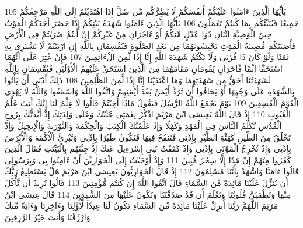 {\tiny\colorbox{cl_aya}{105}} يَأَيُّهَا الَّذِينَ ءَامَنُوا عَلَيْكُمْ أَنفُسَكُمْ لَا يَضُرُّكُم مَّن ضَلَّ إِذَا اهْتَدَيْتُمْ إِلَى اللَّهِ مَرْجِعُكُمْ جَمِيعًا فَيُنَبِّئُكُم بِمَا كُنتُمْ تَعْمَلُونَ
{\tiny\colorbox{cl_aya}{106}} يَأَيُّهَا الَّذِينَ ءَامَنُوا شَهَدَةُ بَيْنِكُمْ إِذَا حَضَرَ أَحَدَكُمُ الْمَوْتُ حِينَ الْوَصِيَّةِ اثْنَانِ ذَوَا عَدْلٍ مِّنكُمْ أَوْ ءَاخَرَانِ مِنْ غَيْرِكُمْ إِنْ أَنتُمْ ضَرَبْتُمْ فِى الْأَرْضِ فَأَصَبَتْكُم مُّصِيبَةُ الْمَوْتِ تَحْبِسُونَهُمَا مِن بَعْدِ الصَّلَوةِ فَيُقْسِمَانِ بِاللَّهِ إِنِ ارْتَبْتُمْ لَا نَشْتَرِى بِهِ ثَمَنًا وَلَوْ كَانَ ذَا قُرْبَى وَلَا نَكْتُمُ شَهَدَةَ اللَّهِ إِنَّا إِذًا لَّمِنَ الْءَاثِمِينَ
{\tiny\colorbox{cl_aya}{107}} فَإِنْ عُثِرَ عَلَى أَنَّهُمَا اسْتَحَقَّا إِثْمًا فََٔاخَرَانِ يَقُومَانِ مَقَامَهُمَا مِنَ الَّذِينَ اسْتَحَقَّ عَلَيْهِمُ الْأَوْلَيَنِ فَيُقْسِمَانِ بِاللَّهِ لَشَهَدَتُنَا أَحَقُّ مِن شَهَدَتِهِمَا وَمَا اعْتَدَيْنَا إِنَّا إِذًا لَّمِنَ الظَّلِمِينَ
{\tiny\colorbox{cl_aya}{108}} ذَلِكَ أَدْنَى أَن يَأْتُوا بِالشَّهَدَةِ عَلَى وَجْهِهَا أَوْ يَخَافُوا أَن تُرَدَّ أَيْمَنٌ بَعْدَ أَيْمَنِهِمْ وَاتَّقُوا اللَّهَ وَاسْمَعُوا وَاللَّهُ لَا يَهْدِى الْقَوْمَ الْفَسِقِينَ
{\tiny\colorbox{cl_aya}{109}} يَوْمَ يَجْمَعُ اللَّهُ الرُّسُلَ فَيَقُولُ مَاذَا أُجِبْتُمْ قَالُوا لَا عِلْمَ لَنَا إِنَّكَ أَنتَ عَلَّمُ الْغُيُوبِ
{\tiny\colorbox{cl_aya}{110}} إِذْ قَالَ اللَّهُ يَعِيسَى ابْنَ مَرْيَمَ اذْكُرْ نِعْمَتِى عَلَيْكَ وَعَلَى وَلِدَتِكَ إِذْ أَيَّدتُّكَ بِرُوحِ الْقُدُسِ تُكَلِّمُ النَّاسَ فِى الْمَهْدِ وَكَهْلًا وَإِذْ عَلَّمْتُكَ الْكِتَبَ وَالْحِكْمَةَ وَالتَّوْرَىةَ وَالْإِنجِيلَ وَإِذْ تَخْلُقُ مِنَ الطِّينِ كَهَئَْةِ الطَّيْرِ بِإِذْنِى فَتَنفُخُ فِيهَا فَتَكُونُ طَيْرًا بِإِذْنِى وَتُبْرِئُ الْأَكْمَهَ وَالْأَبْرَصَ بِإِذْنِى وَإِذْ تُخْرِجُ الْمَوْتَى بِإِذْنِى وَإِذْ كَفَفْتُ بَنِى إِسْرَءِيلَ عَنكَ إِذْ جِئْتَهُم بِالْبَيِّنَتِ فَقَالَ الَّذِينَ كَفَرُوا مِنْهُمْ إِنْ هَذَا إِلَّا سِحْرٌ مُّبِينٌ
{\tiny\colorbox{cl_aya}{111}} وَإِذْ أَوْحَيْتُ إِلَى الْحَوَارِيِّنَ أَنْ ءَامِنُوا بِى وَبِرَسُولِى قَالُوا ءَامَنَّا وَاشْهَدْ بِأَنَّنَا مُسْلِمُونَ
{\tiny\colorbox{cl_aya}{112}} إِذْ قَالَ الْحَوَارِيُّونَ يَعِيسَى ابْنَ مَرْيَمَ هَلْ يَسْتَطِيعُ رَبُّكَ أَن يُنَزِّلَ عَلَيْنَا مَائِدَةً مِّنَ السَّمَاءِ قَالَ اتَّقُوا اللَّهَ إِن كُنتُم مُّؤْمِنِينَ
{\tiny\colorbox{cl_aya}{113}} قَالُوا نُرِيدُ أَن نَّأْكُلَ مِنْهَا وَتَطْمَئِنَّ قُلُوبُنَا وَنَعْلَمَ أَن قَدْ صَدَقْتَنَا وَنَكُونَ عَلَيْهَا مِنَ الشَّهِدِينَ
{\tiny\colorbox{cl_aya}{114}} قَالَ عِيسَى ابْنُ مَرْيَمَ اللَّهُمَّ رَبَّنَا أَنزِلْ عَلَيْنَا مَائِدَةً مِّنَ السَّمَاءِ تَكُونُ لَنَا عِيدًا لِّأَوَّلِنَا وَءَاخِرِنَا وَءَايَةً مِّنكَ وَارْزُقْنَا وَأَنتَ خَيْرُ الرَّزِقِينَ
